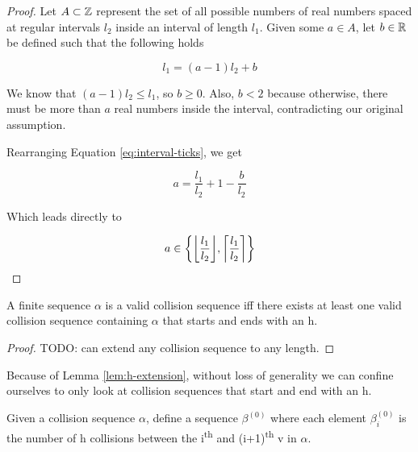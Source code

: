\begin{proof}
	Let $A \subset \mathbb Z$ represent the set of all possible numbers of real numbers spaced at regular intervals $l_2$ inside an interval of length $l_1$. Given some $a \in A$, let $b \in \mathbb R$ be defined such that the following holds

	\begin{equation}\label{eq:interval-ticks}
		l_1 = (a - 1) l_2 + b
	\end{equation}

	We know that $(a - 1) l_2 \le l_1$, so $b \ge 0$. Also, $b < 2$ because otherwise, there must be more than $a$ real numbers inside the interval, contradicting our original assumption.

	Rearranging Equation \ref{eq:interval-ticks}, we get

	\begin{equation}
		a = \frac{l_1}{l_2} + 1 - \frac{b}{l_2}
	\end{equation}

	Which leads directly to

	\begin{equation}
		a \in \cbracket{\floor{\frac{l_1}{l_2}}, \ceil{\frac{l_1}{l_2}}}
	\end{equation}
\end{proof}


\begin{lemma}\label{lem:h-extension}
	A finite sequence $\alpha$ is a valid collision sequence iff there exists at least one valid collision sequence containing $\alpha$ that starts and ends with an h.
\end{lemma}

\begin{proof}
	TODO: can extend any collision sequence to any length. 
\end{proof}


Because of Lemma \ref{lem:h-extension}, without loss of generality we can confine ourselves to only look at collision sequences that start and end with an h.

\begin{definition}
	Given a collision sequence $\alpha$, define a sequence $\beta^{(0)}$ where each element $\beta^{(0)}_i$ is the number of h collisions between the i\textsuperscript{th} and (i+1)\textsuperscript{th} v in $\alpha$.
\end{definition}

